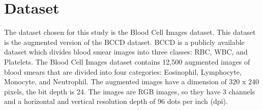 \section{Dataset}

The dataset chosen for this study is the Blood Cell Images dataset.
\cite{BloodCellImages}
This dataset is the augmented version of the BCCD 
\cite{BCCD}
dataset. BCCD is a publicly available dataset which divides blood smear images into three classes: RBC, WBC, and Platelets.
The Blood Cell Images dataset contains 12,500 augmented images of blood smears that are divided into four categories: Eosinophil, Lymphocyte, Monocyte, and Neutrophil.
The augmented images have a dimension of 320 x 240 pixels, the bit depth is 24. The images are RGB images, so they have 3 channels and a horizontal and vertical resolution depth of 96 dots per inch (dpi).